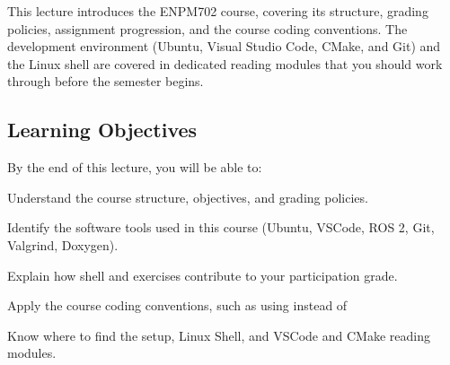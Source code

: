 
This lecture introduces the ENPM702 course, covering its structure,
grading policies, assignment progression, and the course coding
conventions. The development environment (Ubuntu, Visual Studio Code,
CMake, and Git) and the Linux shell are covered in dedicated reading
modules that you should work through before the semester begins.

\subsection*{Learning Objectives}

\begin{remarkbox}{}
   By the end of this lecture, you will be able to:
   \begin{compactitem}
       \item Understand the course structure, objectives, and grading policies.
       \item Identify the software tools used in this course (Ubuntu, VSCode, ROS 2, Git, Valgrind, Doxygen).
       \item Explain how shell and \CC exercises contribute to your participation grade.
       \item Apply the course coding conventions, such as using  instead of 
       \item Know where to find the setup, Linux Shell, and VSCode and CMake reading modules.
   \end{compactitem}
\end{remarkbox}
